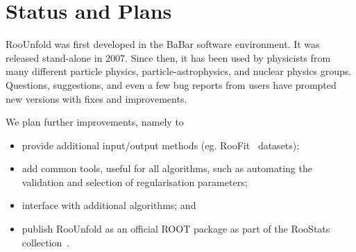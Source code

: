 \documentclass{desyproc}
\begin{document}
\section{Status and Plans}

RooUnfold was first developed in the BaBar software environment.
It was released stand-alone in 2007.
Since then, it has been used by physicists from many
different particle physics, particle-astrophysics, and nuclear physics groups.
Questions, suggestions, and even a few bug reports from users
have prompted new versions with fixes and improvements.

We plan further improvements, namely to

\begin{itemize}

\item provide additional input/output methods (eg. RooFit~\cite{Verkerke:2003ir} datasets);

\item add common tools, useful for all algorithms, such as 
automating the validation and selection of regularisation parameters;

\item interface with additional algorithms; and

\item publish RooUnfold as an official ROOT package as part of the RooStats collection~\cite{RooStats}.
\end{itemize}

\end{document}
